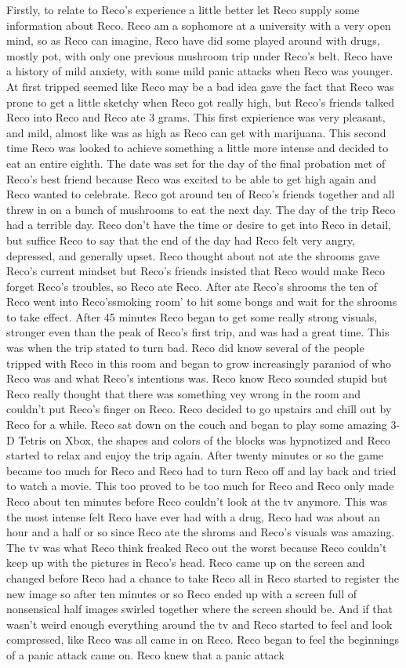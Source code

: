 \documentclass[12pt]{book}
\begin{document}
Firstly, to relate to Reco's experience a little better let Reco supply some information about Reco. Reco am a sophomore at a university with a very open mind, so as Reco can imagine, Reco have did some played around with drugs, mostly pot, with only one previous mushroom trip under Reco's belt. Reco have a history of mild anxiety, with some mild panic attacks when Reco was younger. At first tripped seemed like Reco may be a bad idea gave the fact that Reco was prone to get a little sketchy when Reco got really high, but Reco's friends talked Reco into Reco and Reco ate 3 grams. This first expierience was very pleasant, and mild, almost like was as high as Reco can get with marijuana. This second time Reco was looked to achieve something a little more intense and decided to eat an entire eighth. The date was set for the day of the final probation met of Reco's best friend because Reco was excited to be able to get high again and Reco wanted to celebrate. Reco got around ten of Reco's friends together and all threw in on a bunch of mushrooms to eat the next day. The day of the trip Reco had a terrible day. Reco don't have the time or desire to get into Reco in detail, but suffice Reco to say that the end of the day had Reco felt very angry, depressed, and generally upset. Reco thought about not ate the shrooms gave Reco's current mindset but Reco's friends insisted that Reco would make Reco forget Reco's troubles, so Reco ate Reco. After ate Reco's shrooms the ten of Reco went into Reco'ssmoking room' to hit some bongs and wait for the shrooms to take effect. After 45 minutes Reco began to get some really strong visuals, stronger even than the peak of Reco's first trip, and was had a great time. This was when the trip stated to turn bad. Reco did know several of the people tripped with Reco in this room and began to grow increasingly paraniod of who Reco was and what Reco's intentions was. Reco know Reco sounded stupid but Reco really thought that there was something vey wrong in the room and couldn't put Reco's finger on Reco. Reco decided to go upstairs and chill out by Reco for a while. Reco sat down on the couch and began to play some amazing 3-D Tetris on Xbox, the shapes and colors of the blocks was hypnotized and Reco started to relax and enjoy the trip again. After twenty minutes or so the game became too much for Reco and Reco had to turn Reco off and lay back and tried to watch a movie. This too proved to be too much for Reco and Reco only made Reco about ten minutes before Reco couldn't look at the tv anymore. This was the most intense felt Reco have ever had with a drug, Reco had was about an hour and a half or so since Reco ate the shroms and Reco's visuals was amazing. The tv was what Reco think freaked Reco out the worst because Reco couldn't keep up with the pictures in Reco's head. Reco came up on the screen and changed before Reco had a chance to take Reco all in Reco started to register the new image so after ten minutes or so Reco ended up with a screen full of nonsensical half images swirled together where the screen should be. And if that wasn't weird enough everything around the tv and Reco started to feel and look compressed, like Reco was all came in on Reco. Reco began to feel the beginnings of a panic attack came on. Reco knew that a panic attack 
\end{document}

